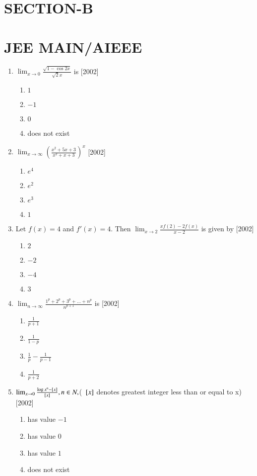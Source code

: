 \documentclass[journal,12pt,twocolumn]{IEEEtran}
\theoremstyle{remark}
\begin{document}
\section*{\textbf{SECTION-B}}
\section*{\textbf{JEE MAIN/AIEEE}}
\begin{enumerate}
    \item $\lim_{x\to 0}{\frac{\sqrt{1-\cos{2x}}}{\sqrt{2}x}}$ is
	    \hfill[2002]
    \begin{enumerate}
			\item $1$
			\item $-1$
			\item $0$
			\item does not exist
		\end{enumerate}
    \item  $\lim_{x\to \infty}({\frac{x^2+5x+3}{x^2+x+3}})^x$
	    \hfill[2002]
    \begin{enumerate}
			\item $e^4$
			\item $e^2$
			\item $e^3$
			\item $1$
		\end{enumerate}
    \item Let $f(x)=4$ and $f'(x)=4$. Then $\lim_{x\to 2}{\frac{xf(2)-2f(x)}{x-2}}$ is given by
	    \hfill[2002]
    \begin{enumerate}
			\item $2$
			\item $-2$
			\item $-4$
			\item $3$
		\end{enumerate}
    \item $\lim_{n\to \infty}{\frac{1^p+2^p+3^p+\dots+n^p}{n^{p+1}}}$ is
	    \hfill[2002]
    \begin{enumerate}
			\item $\frac{1}{p+1}$
			\item $\frac{1}{1-p}$
			\item $\frac{1}{p}-\frac{1}{p-1}$
			\item $\frac{1}{p+2}$
		\end{enumerate}
	\item $\lim_{x\to 0}{\frac{\log x^n- {}\left[x\right]}{{}\left[x\right]}}, n\in N, $( ${}\left[x\right]$ denotes greatest integer less than or equal to x)
	    \hfill[2002]
    \begin{enumerate}
			\item has value $-1$
			\item has value $0$
			\item has value $1$
			\item does not exist
		\end{enumerate}

\end{enumerate}
\end{document}
